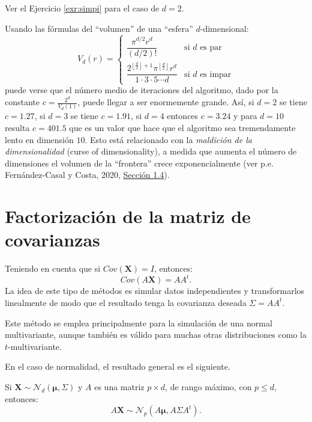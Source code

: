 \documentclass[
]{book}
\theoremstyle{break}
\theoremstyle{definition}
\theoremstyle{definition}
\theoremstyle{definition}
\theoremstyle{remark}
\let\BeginKnitrBlock\begin \let\EndKnitrBlock\end
\begin{document}
Ver el Ejercicio \ref{exr:simpi} para el caso de \(d=2\).

Usando las fórmulas del ``volumen'' de una ``esfera'' \(d\)-dimensional:
\[V_d\left( r\right)  =\left\{
\begin{array}{ll}
\dfrac{\pi^{d/2}r^{d}}{\left( d/2\right)  !} & \text{si } d \text{ es par}\\
\dfrac{2^{\left\lfloor \frac{d}{2}\right\rfloor +1}\pi^{\left\lfloor \frac{d}{2}\right\rfloor }r^{d}}{1\cdot3\cdot5\cdots d} & \text{si } d \text{ es impar}
\end{array}\right.\]
puede verse que el número medio de iteraciones del algoritmo, dado por la constante
\(c=\frac{2^{d}}{V_d\left(1 \right)}\), puede llegar a ser enormemente grande.
Así, si \(d=2\) se tiene \(c=1.27\), si \(d=3\) se tiene \(c=1.91\), si \(d=4\) entonces \(c=3.24\) y para
\(d=10\) resulta \(c=401.5\) que es un valor que hace que el algoritmo sea
tremendamente lento en dimensión \(10\).
Esto está relacionado con la \emph{maldición de la dimensionalidad} (curse of dimensionality), a medida que aumenta el número de dimensiones el volumen de la ``frontera'' crece exponencialmente (ver p.e. Fernández-Casal y Costa, 2020, \href{https://rubenfcasal.github.io/aprendizaje_estadistico/dimen-curse.html}{Sección 1.4}).

\hypertarget{fact-cov}{%
\section{Factorización de la matriz de covarianzas}\label{fact-cov}}

Teniendo en cuenta que si \(Cov(\mathbf{X})= I\), entonces:
\[Cov(A\mathbf{X}) = AA^t.\]
La idea de este tipo de métodos es simular datos independientes y transformarlos linealmente de modo que el resultado tenga la covarianza deseada \(\Sigma = AA^t\).

Este método se emplea principalmente para la simulación de una
normal multivariante, aunque también es válido para muchas otras
distribuciones como la \(t\)-multivariante.

En el caso de normalidad, el resultado general es el siguiente.

\BeginKnitrBlock{proposition}
\protect\hypertarget{prp:unnamed-chunk-4}{}{\label{prp:unnamed-chunk-4} }
Si \(\mathbf{X} \sim \mathcal{N}_d\left( \boldsymbol\mu,\Sigma \right)\) y \(A\) es una matriz \(p\times d\), de
rango máximo, con \(p\leq d\), entonces:
\[A\mathbf{X} \sim \mathcal{N}_{p}\left(A\boldsymbol\mu,A\Sigma A^t\right).\]
\EndKnitrBlock{proposition}
\end{document}

